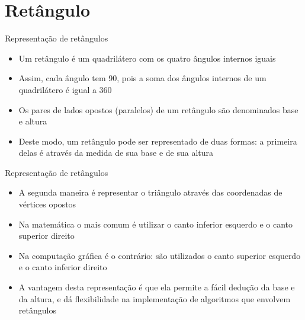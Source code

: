 \section{Retângulo}

\begin{frame}[fragile]{Representação de retângulos}

    \begin{itemize}
        \item Um retângulo é um quadrilátero com os quatro ângulos internos iguais 
        \pause

        \item Assim, cada ângulo tem 90\textdegree, pois a soma dos ângulos internos de um 
            quadrilátero é igual a 360\textdegree
        \pause

        \item Os pares de lados opostos (paralelos) de um retângulo são denominados base e
            altura
        \pause

        \item Deste modo, um retângulo pode ser representado de duas formas: a primeira delas é 
            através da medida de sua base e de sua altura
    \end{itemize}
        \pause


\end{frame}

\begin{frame}[fragile]{Representação de retângulos}

    \begin{itemize}
        \item A segunda maneira é representar o triângulo através das coordenadas de 
            vértices opostos
        \pause

        \item Na matemática o mais comum é utilizar o canto inferior esquerdo e o canto superior 
            direito
        \pause

        \item Na computação gráfica é o contrário: são utilizados o canto superior esquerdo e o 
            canto inferior direito
        \pause

        \item A vantagem desta representação é que ela permite a fácil dedução da base e da 
            altura, e dá flexibilidade na implementação de algoritmos que envolvem retângulos

    \end{itemize}

\end{frame}

